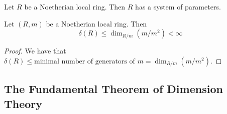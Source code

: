 \documentclass[a4paper]{article}
\begin{document}
\begin{lmm}{}{} Let $R$ be a Noetherian local ring. Then $R$ has a system of parameters. 
\end{lmm}

\begin{prp}{}{} Let $(R,m)$ be a Noetherian local ring. Then $$\delta(R)\leq\dim_{R/m}(m/m^2)<\infty$$ 
\begin{proof}
We have that $\delta(R)\leq\text{minimal number of generators of }m=\dim_{R/m}(m/m^2)$. 
\end{proof}
\end{prp}

\subsection{The Fundamental Theorem of Dimension Theory}
\end{document}
